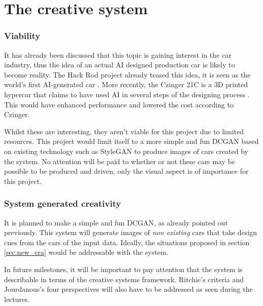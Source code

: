 \part{The creative system}
\label{part:creative_system}

\clearpage
\section{Viability}
\label{sec:viability}

It has already been discussed that this topic is gaining interest in the car industry, thus the idea of an actual AI designed production car is likely to become reality.
The Hack Rod project already teased this idea, it is seen as the world's first AI-generated car \citep{hackrod}. 
More recently, the Czinger 21C is a 3D printed hypercar that claims to have used AI in several steps of the designing process \citep{czinger}.
This would have enhanced performance and lowered the cost according to Czinger.

Whilst these are interesting, they aren't viable for this project due to limited resources.
This project would limit itself to a more simple and fun DCGAN based on existing technology such as StyleGAN to produce images of cars created by the system.
No attention will be paid to whether or not these cars may be possible to be produced and driven, only the visual aspect is of importance for this project.


\section{System generated creativity}
\label{sec:generated_creativity}

It is planned to make a simple and fun DCGAN, as already pointed out previously.
This system will generate images of \textit{non existing} cars that take design cues from the cars of the input data.
Ideally, the situations proposed in section \ref{sec:new_era} would be addressable with the system.

In future milestones, it will be important to pay attention that the system is describable in terms of the creative systems framework. 
Ritchie's criteria and Jourdanous’s four perspectives will also have to be addressed as seen during the lectures.


